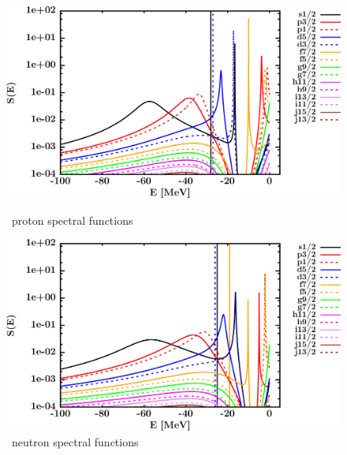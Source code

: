 \begin{figure}[hbtp]
    \centering
    \begin{minipage}{0.42\textwidth}
        \centering
        \includegraphics[width=\textwidth]{figures/ca48_protonSpectralFunctions.png}
        \caption*{\caEight\ proton spectral functions}
        \label{DOMFitData_ca48_proton_spectralFunctions}
    \end{minipage}\hspace{6pt}
    \begin{minipage}{0.42\textwidth}
        \centering
        \includegraphics[width=\linewidth]{figures/ca48_neutronSpectralFunctions.png}
        \caption*{\caEight\ neutron spectral functions}
        \label{DOMFitData_ca48_neutron_spectralFunctions}
    \end{minipage}
\end{figure}
\afterpage{\clearpage}
